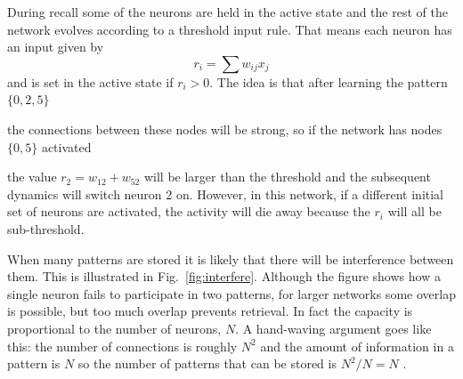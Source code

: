 \documentclass[12pt]{article}
\begin{document}
During recall some of the neurons are held in the active state and the
rest of the network evolves according to a threshold input rule. That
means each neuron has an input given by
\begin{equation}
r_i=\sum{w_{ij}x_j}
\end{equation}
and is set in the active state if $r_i>0$. The idea is that after
learning the pattern $\{0,2,5\}$
\begin{center}
\end{center}
the connections between these nodes will be strong, so if the network has nodes $\{0,5\}$ activated
\begin{center}
\end{center}
the value $r_{2}=w_{12}+w_{52}$ will be larger than the threshold and
the subsequent dynamics will switch neuron 2 on. However, in this
network, if a different initial set of neurons are activated, the
activity will die away because the $r_i$ will all be sub-threshold.

When many patterns are stored it is likely that there will be
interference between them. This is illustrated in
Fig.~\ref{fig:interfere}. Although the figure shows how a single
neuron fails to participate in two patterns, for larger networks some
overlap is possible, but too much overlap prevents retrieval. In fact
the capacity is proportional to the number of neurons, $N$. A
hand-waving argument goes like this: the number of connections is
roughly $N^2$ and the amount of information in a pattern is $N$ so the
number of patterns that can be stored is $N^2/N=N$ \cite{Amit1992a}.
\end{document}
